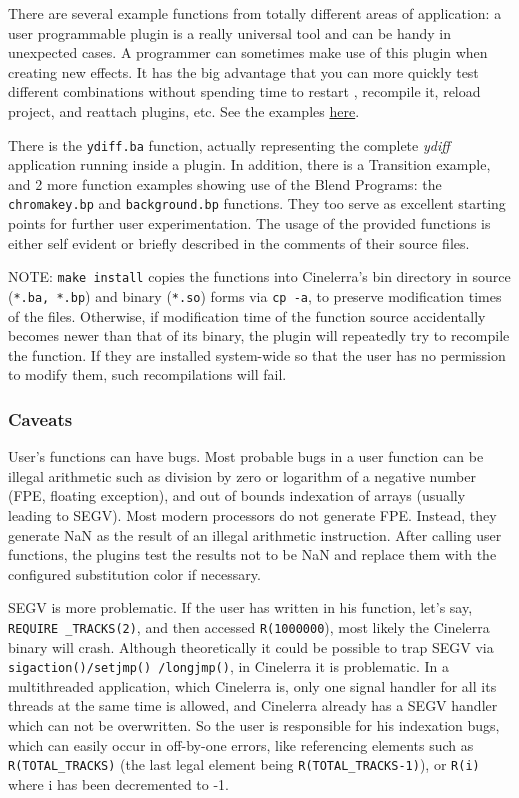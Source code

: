 There are several example functions from totally different areas of application: a user programmable plugin is a really universal tool and can be handy in unexpected cases. A programmer can sometimes make use of this plugin when creating new effects. It has the big advantage that you can more quickly test different combinations without spending time to restart \CGG{}, recompile it, reload project, and reattach plugins, etc.  See the examples \href{https://download.cinelerra-gg.org/download.php?file=testing\%2FBlendPluginExamples/Examples.txt}{here}. 

There is the \texttt{ydiff.ba} function, actually representing the complete \textit{ydiff} application running inside a plugin. 
In addition, there is a Transition example,
and 2 more function examples showing use of the Blend Programs: the \texttt{chromakey.bp} and \texttt{background.bp} functions. They too serve as excellent starting points for further user experimentation. The usage of the provided functions is either self evident or briefly
described in the comments of their source files.

NOTE: \texttt{make install} copies the functions into Cinelerra's bin directory in source (\texttt{*.ba, *.bp}) and binary (\texttt{*.so}) forms via \texttt{cp -a}, to preserve modification times of the files. Otherwise, if modification time of the function source accidentally becomes newer than that of its binary, the plugin will repeatedly try to recompile the function. If they are installed system-wide so that the user has no permission to modify them, such recompilations will fail.


\subsubsection*{Caveats}
\label{ssub:caveats}

User's functions can have bugs.  Most probable bugs in a user function can be illegal arithmetic such as division by zero or logarithm of a negative number (FPE, floating exception), and out of bounds indexation of arrays (usually leading to SEGV).  Most modern processors do not generate FPE. Instead, they generate NaN as the result of an illegal arithmetic instruction. After calling user functions, the plugins test the results not to be NaN and replace them with the configured substitution color if necessary.

SEGV is more problematic. If the user has written in his function, let's say, \texttt{REQUIRE \_TRACKS(2)}, and then accessed \texttt{R(1000000}), most likely the Cinelerra binary will crash. Although theoretically it could be possible to trap SEGV via \texttt{sigaction()/setjmp() /longjmp()}, in Cinelerra it is problematic. In a multithreaded application, which Cinelerra is, only one signal handler for all its threads at the same time is allowed, and Cinelerra already has a SEGV handler which can not be overwritten. So the user is responsible for his indexation bugs, which can easily occur in off-by-one errors, like referencing elements such as \texttt{R(TOTAL\_TRACKS)} (the last legal element being \texttt{R(TOTAL\_TRACKS-1)}), or \texttt{R(i)} where i has been decremented to -1.

